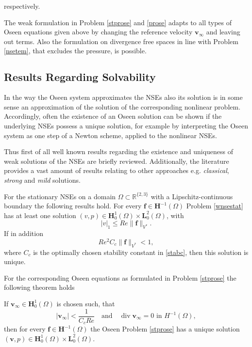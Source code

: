\documentclass[a4paper,10pt,BCOR=15mm]{scrbook}
\DeclareMathOperator{\dive}{div}
\providecommand{\abs}[1]{\lvert#1\rvert}
\providecommand{\norm}[1]{\lVert#1 \rVert}
\providecommand{\andi}[0]{\quad \text{and} \quad}
\begin{document}
respectively.

\begin{rem}
The weak formulation in Problem \ref{stprose} and \ref{prose} adapts to all types of Oseen equations given above by changing the reference velocity $\mathbf v_\infty$ and leaving out terms. Also the formulation on divergence free spaces in line with Problem \ref{nsetem}, that excludes the pressure, is possible.
\end{rem}

\subsection{Results Regarding Solvability}
In the way the Oseen system approximates the NSEs also its solution is in some sense an approximation of the solution of the corresponding nonlinear problem. Accordingly, often the existence of an Oseen solution can be shown if the underlying NSEs possess a unique solution, for example by interpreting the Oseen system as one step of a Newton scheme, applied to the nonlinear NSEs. 

Thus first of all well known results regarding the existence and uniqueness of weak solutions of the NSEs are briefly reviewed. Additionally, the literature provides a vast amount of results relating to other approaches e.g. \textit{classical}, \textit{strong} and \textit{mild} solutions.

For the stationary NSEs on a domain $\Omega \subset \mathbb R ^{ \{2,3\} }$ with a Lipschitz-continuous boundary the following results hold. For every $\mathbf f \in \mathbf H ^{-1}(\Omega)$ Problem \ref{wnsestat} has at least one solution $(v,p) \in \mathbf H_0 ^1(\Omega) \times \mathbf L_0^2(\Omega)$, with 
\begin{equation}\label{aprnse}
 \abs{v}_1 \leq Re \norm{\mathbf f}_{V^*} .
\end{equation}
If in addition 
\begin{equation}\label{uninse}
 Re^2 C_c \norm{\mathbf f}_{V^*} < 1,
\end{equation}
where $C_c$ is the optimally chosen stability constant in \eqref{stabc}, then this solution is unique. 

For the corresponding Oseen equations as formulated in Problem \ref{stprose} the following theorem holds
\begin{thm}\label{unisose}
 If $\mathbf v_\infty \in \mathbf H_0^1(\Omega)$ is chosen such, that 
\begin{equation}\label{smallvinf}
 \abs{\mathbf v_\infty} < \frac{1}{C_cRe} \andi \dive \mathbf v_\infty = 0 \text{ in } H^{-1}(\Omega),
\end{equation}
then for every $\mathbf f \in \mathbf H ^{-1}(\Omega)$ the Oseen Problem \ref{stprose} has a unique solution $(\mathbf v,p) \in \mathbf H_0 ^1(\Omega) \times \mathbf L_0^2(\Omega)$.
\end{thm}
\end{document}
